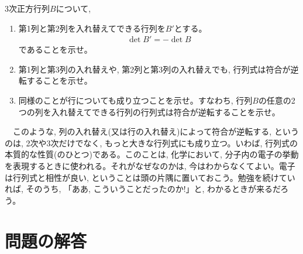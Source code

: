 \begin{exq}\label{q:univ_det3D2} 3次正方行列$B$について, 
\begin{enumerate}
\item 第1列と第2列を入れ替えてできる行列を$B'$とする。
\begin{eqnarray}\det B'=-\det B\end{eqnarray}
であることを示せ。
\item 第1列と第3列の入れ替えや, 第2列と第3列の入れ替えでも, 行列式は符合が逆転することを示せ。
\item 同様のことが行についても成り立つことを示せ。すなわち, 行列$B$の任意の2つの列を入れ替えてできる行列の行列式は符合が逆転することを示せ。
\end{enumerate}
　このような, 列の入れ替え(又は行の入れ替え)によって符合が逆転する, というのは, 2次や3次だけでなく, もっと大きな行列式にも成り立つ。いわば, 行列式の本質的な性質(のひとつ)である。このことは, 化学において, 分子内の電子の挙動を表現するときに使われる。それがなぜなのかは, 今はわからなくてよい。電子は行列式と相性が良い, ということは頭の片隅に置いておこう。勉強を続けていれば, そのうち, 「ああ, こういうことだったのか!」と, わかるときが来るだろう。
\end{exq}


\section*{問題の解答}

